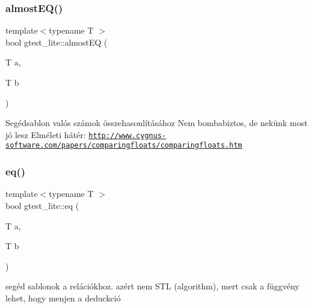 \subsubsection{\texorpdfstring{almost\+E\+Q()}{almostEQ()}}
{\footnotesize\ttfamily template$<$typename T $>$ \\
bool gtest\+\_\+lite\+::almost\+EQ (\begin{DoxyParamCaption}\item[{T}]{a,  }\item[{T}]{b }\end{DoxyParamCaption})}

Segédsablon valós számok összehasonlításához Nem bombabiztos, de nekünk most jó lesz Elméleti hátér\+: \href{http://www.cygnus-software.com/papers/comparingfloats/comparingfloats.htm}{\tt http\+://www.\+cygnus-\/software.\+com/papers/comparingfloats/comparingfloats.\+htm} \mbox{\label{namespacegtest__lite_aa7762f23094d59c699ec402e1a37640c}} 
\subsubsection{\texorpdfstring{eq()}{eq()}}
{\footnotesize\ttfamily template$<$typename T $>$ \\
bool gtest\+\_\+lite\+::eq (\begin{DoxyParamCaption}\item[{T}]{a,  }\item[{T}]{b }\end{DoxyParamCaption})}

segéd sablonok a relációkhoz. azért nem S\+TL (algorithm), mert csak a függvény lehet, hogy menjen a deduckció \mbox{\label{namespacegtest__lite_aea477921e4c26d2a2806bc3011066270}} 
